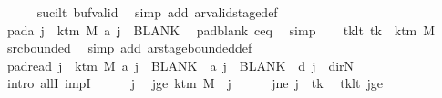 \begin{isabellebody}
\ \ \ \ \isamarkupfalse%
\ suc{\isacharunderscore}{\kern0pt}i{\isacharunderscore}{\kern0pt}lt\ buf{\isacharunderscore}{\kern0pt}valid\ \isamarkupfalse%
\ {\isacharparenleft}{\kern0pt}simp\ add{\isacharcolon}{\kern0pt}\ ar{\isacharunderscore}{\kern0pt}valid{\isacharunderscore}{\kern0pt}stage{\isacharunderscore}{\kern0pt}def{\isacharparenright}{\kern0pt}\isanewline
\ \ \isamarkupfalse%
\ pad{\isacharunderscore}{\kern0pt}a{\isacharcolon}{\kern0pt}\ {\isachardoublequoteopen}{\isasymforall}j\ {\isasymge}\ k{\isacharunderscore}{\kern0pt}tm\ M{\isachardot}{\kern0pt}\ {\isacharquery}{\kern0pt}a\ j\ {\isacharequal}{\kern0pt}\ BLANK{}{\isachardoublequoteclose}\ \isamarkupfalse%
\ pad{\isacharunderscore}{\kern0pt}blank\ c{\isacharprime}{\kern0pt}{\isacharunderscore}{\kern0pt}eq\ \isamarkupfalse%
\ simp\isanewline
\ \ \isamarkupfalse%
\ tk{\isacharunderscore}{\kern0pt}lt{\isacharcolon}{\kern0pt}\ {\isachardoublequoteopen}tk\ {\isacharless}{\kern0pt}\ k{\isacharunderscore}{\kern0pt}tm\ M{\isachardoublequoteclose}\ \isamarkupfalse%
\ src{\isacharunderscore}{\kern0pt}bounded\ \isamarkupfalse%
\ {\isacharparenleft}{\kern0pt}simp\ add{\isacharcolon}{\kern0pt}\ ar{\isacharunderscore}{\kern0pt}stage{\isacharunderscore}{\kern0pt}bounded{\isacharunderscore}{\kern0pt}def{\isacharparenright}{\kern0pt}\isanewline
\ \ \isamarkupfalse%
\ pad{\isacharunderscore}{\kern0pt}read{\isacharcolon}{\kern0pt}\ {\isachardoublequoteopen}{\isasymforall}j\ {\isasymge}\ k{\isacharunderscore}{\kern0pt}tm\ M{\isachardot}{\kern0pt}\ {\isacharquery}{\kern0pt}a\ j\ {\isacharequal}{\kern0pt}\ BLANK{}\ {\isasymand}\ {\isacharquery}{\kern0pt}a\ j\ {\isacharequal}{\kern0pt}\ BLANK{}\ {\isasymand}\ {\isacharquery}{\kern0pt}d\ j\ {\isacharequal}{\kern0pt}\ dir{\isachardot}{\kern0pt}N{\isachardoublequoteclose}\isanewline
\ \ \isamarkupfalse%
\ {\isacharparenleft}{\kern0pt}intro\ allI\ impI{\isacharparenright}{\kern0pt}\isanewline
\ \ \ \ \isamarkupfalse%
\ j\ \isamarkupfalse%
\ jge{\isacharcolon}{\kern0pt}\ {\isachardoublequoteopen}k{\isacharunderscore}{\kern0pt}tm\ M\ {\isasymle}\ j{\isachardoublequoteclose}\isanewline
\ \ \ \ \isamarkupfalse%
\ jne{\isacharcolon}{\kern0pt}\ {\isachardoublequoteopen}j\ {\isasymnoteq}\ tk{\isachardoublequoteclose}\ \isamarkupfalse%
\ tk{\isacharunderscore}{\kern0pt}lt\ jge\ \isamarkupfalse%

\end{isabellebody}
